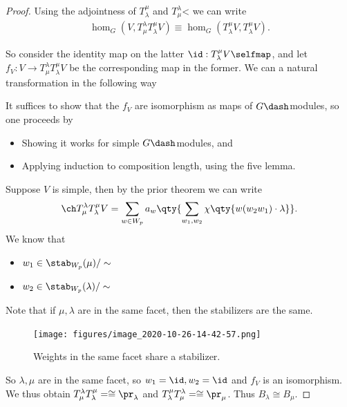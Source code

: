 \begin{proof}

Using the adjointness of \(T_\lambda^\mu\) and
\(T_\mu^\lambda\)\textless{} we can write
\begin{align*}  
\hom_G(V, T_\mu^\lambda T_\lambda^\mu V) \equiv
\hom_G(T_\lambda^\mu V,  T_\lambda^\mu V)
.\end{align*}

So consider the identity map on the latter
\(\id: T_\lambda^\mu V\selfmap\), and let
\(f_V: V\to T_\mu^\lambda T_\lambda^\mu V\) be the corresponding map in
the former. We can a natural transformation in the following way

\begin{center}\end{center}

It suffices to show that the \(f_V\) are isomorphism as maps of
\(G\dash\)modules, so one proceeds by

\begin{itemize}
\item
  Showing it works for simple \(G\dash\)modules, and
\item
  Applying induction to composition length, using the five lemma.
\end{itemize}

Suppose \(V\) is simple, then by the prior theorem we can write
\begin{align*}  
\ch T_\mu^\lambda T_\lambda^\mu V = 
\sum_{w\in W_p} a_w \qty{\sum_{w_1, w_2} \chi\qty{w(w_2 w_1)\cdot \lambda } }
.\end{align*} We know that

\begin{itemize}
\tightlist
\item
  \(w_1\in \stab_{W_p}(\mu) / \sim\)
\item
  \(w_2\in \stab_{W_p}(\lambda) / \sim\)
\end{itemize}

Note that if \(\mu, \lambda\) are in the same facet, then the
stabilizers are the same.

\begin{figure}
\centering
\texttt{[image: figures/image\_2020-10-26-14-42-57.png]}
\caption{Weights in the same facet share a stabilizer.}
\end{figure}

So \(\lambda, \mu\) are in the same facet, so \(w_1 = \id, w_2 = \id\)
and \(f_V\) is an isomorphism. We thus obtain
\(T_\mu^\lambda T_\lambda^\mu =\cong \pr_\lambda\) and
\(T_\lambda^\mu T_\mu^\lambda =\cong \pr_\mu\). Thus
\(B_\lambda \cong B_\mu\).

\end{proof}

